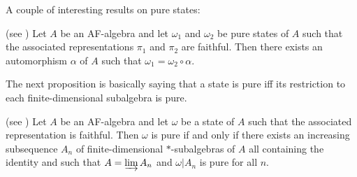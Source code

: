 A couple of interesting results on pure states:
\begin{proposition}(see \cite{bratteli})
Let $A$ be an AF-algebra and let $\omega_1$ and $\omega_2$ be pure states of $A$ such that the associated representations $\pi_1$ and $\pi_2$ are faithful. Then there exists an automorphism $\alpha$ of $A$ such that $\omega_1 = \omega_2 \circ \alpha$.
\end{proposition}
The next proposition is basically saying that a state is pure iff its restriction to each finite-dimensional subalgebra is pure.
\begin{proposition}(see \cite{bratteli})
Let $A$ be an AF-algebra and let $\omega$ be a state of $A$ such that the associated representation is faithful. Then $\omega$ is pure if and only if there exists an increasing subsequence $A_n$ of finite-dimensional $\ast$-subalgebras of $A$ all containing the identity and such that $A = \varinjlim A_n$ and $\omega | A_n$ is pure for all $n$.
\end{proposition}